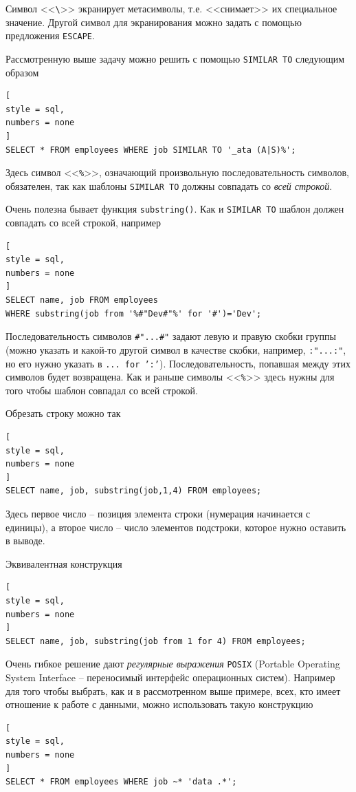 \documentclass[%
	11pt,
	a4paper,
	utf8,
		]{article}
\begin{document}
Символ <<\verb|\|>> экранирует метасимволы, т.е. <<снимает>> их специальное значение. Другой символ для экранирования можно задать с помощью предложения \texttt{ESCAPE}.

Рассмотренную выше задачу можно решить с помощью \texttt{SIMILAR TO} следующим образом
\begin{lstlisting}[
style = sql,
numbers = none
]
SELECT * FROM employees WHERE job SIMILAR TO '_ata (A|S)%';
\end{lstlisting}

Здесь символ <<\texttt{\%}>>, означающий произвольную последовательность символов, обязателен, так как шаблоны \texttt{SIMILAR TO} должны совпадать со \emph{всей строкой}.

Очень полезна бывает функция \texttt{substring()}. Как и \texttt{SIMILAR TO} шаблон должен совпадать со всей строкой, например
\begin{lstlisting}[
style = sql,
numbers = none
]
SELECT name, job FROM employees
WHERE substring(job from '%#"Dev#"%' for '#')='Dev';
\end{lstlisting}

Последовательность символов \texttt{\#"...\#"} задают левую и правую скобки группы (можно указать и какой-то другой символ в качестве скобки, например, \texttt{:"...:"}, но его нужно указать в \texttt{... for ':'}). Последовательность, попавшая между этих символов будет возвращена. Как и раньше символы <<\texttt{\%}>> здесь нужны для того чтобы шаблон совпадал со всей строкой.

Обрезать строку можно так
\begin{lstlisting}[
style = sql,
numbers = none
]
SELECT name, job, substring(job,1,4) FROM employees;
\end{lstlisting}

Здесь первое число -- позиция элемента строки (нумерация начинается с единицы), а второе число -- число элементов подстроки, которое нужно оставить в выводе.

Эквивалентная конструкция
\begin{lstlisting}[
style = sql,
numbers = none
]
SELECT name, job, substring(job from 1 for 4) FROM employees;
\end{lstlisting}

Очень гибкое решение дают \emph{регулярные выражения} \texttt{POSIX} (Portable Operating System Interface -- переносимый интерфейс операционных систем). Например для того чтобы выбрать, как и в рассмотренном выше примере, всех, кто имеет отношение к работе с данными, можно использовать такую конструкцию
\begin{lstlisting}[
style = sql,
numbers = none
]
SELECT * FROM employees WHERE job ~* 'data .*';
\end{lstlisting}
\end{document}
